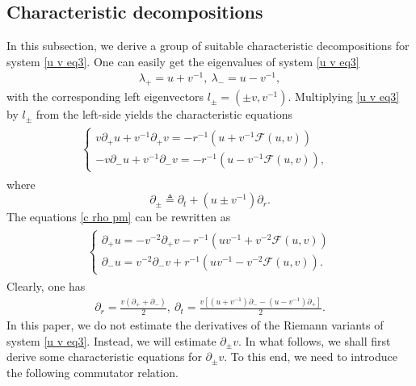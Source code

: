 \documentclass[10pt,leqno]{amsart}
\numberwithin{equation}{section}
\begin{document}
\subsection{Characteristic decompositions}
In this subsection, we derive a group of suitable characteristic decompositions for system \eqref{u v eq3}. One can easily get the eigenvalues of system \eqref{u v eq3}
\begin{equation} \label{lambda pm}
	\begin{aligned}
		\lambda_+=u+v^{-1}, \ \lambda_-=u-v^{-1},
	\end{aligned}
\end{equation}
with the corresponding left eigenvectors $l_{\pm} = (\pm v,v^{-1})$. Multiplying \eqref{u v eq3} by $l_{\pm}$ from the left-side yields the characteristic equations
\begin{equation} \label{c rho pm}
	\begin{aligned}
		\begin{split}
			\left\lbrace
			\begin{array}{lr}	
				v \partial_{+} u + v^{-1} \partial_{+} v  = -r^{-1} (u + v^{-1}\mathcal{F}(u,v)) &\\
				- v \partial_{-} u + v^{-1} \partial_{-} v = -r^{-1} (u - v^{-1}\mathcal{F}(u,v)),&
			\end{array}	
			\right.
		\end{split}	
	\end{aligned}
\end{equation}
where 
\begin{equation} \label{def of partial pm}
	\partial_{\pm} \triangleq \partial_{t} + (u \pm v^{-1}) \partial_{r} .
\end{equation}
The equations \eqref{c rho pm} can be rewritten as
\begin{equation} \label{u c pm}
	\begin{aligned}
		\begin{split}
			\left\lbrace
			\begin{array}{lr}	
				\partial_{+} u = -v^{-2}\partial_{+} v - r^{-1}( uv^{-1}+ v^{-2}\mathcal{F}(u,v)) \\
				\partial_{-} u = v^{-2}\partial_{-} v + r^{-1}( uv^{-1}- v^{-2}\mathcal{F}(u,v)).
			\end{array}	
			\right.
		\end{split}	
	\end{aligned}
\end{equation}
Clearly, one has
\begin{equation} \label{partial rt pm}
	\begin{aligned}
		\partial_{r}=\frac{v(\partial_{+}+\partial_{-})}{2}, \ \partial_{t}=\frac{v\left[ (u+v^{-1})\partial_{-}-(u-v^{-1}) \partial_{+}\right] }{2}.
	\end{aligned}
\end{equation}
In this paper, we do not estimate the derivatives of the Riemann variants of system \eqref{u v eq3}. Instead, we will estimate $\partial_{\pm}v$. In what follows, we shall first derive some characteristic equations for $\partial_{\pm}v$. To this end, we need to introduce the following commutator relation.
\end{document}
